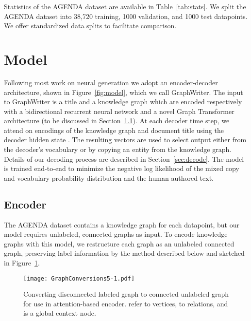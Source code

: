 \documentclass[11pt,a4paper]{article}
\begin{document}
Statistics of the AGENDA dataset are available in Table~\ref{tab:stats}.
We split the AGENDA dataset into 38,720 training, 1000 validation, and 1000 test datapoints.
We offer standardized data splits to facilitate comparison. 



\section{Model}

Following most work on neural generation we adopt an encoder-decoder architecture, shown in Figure~\ref{fig:model}, which we call GraphWriter.
The input to GraphWriter is a title and a knowledge graph which are encoded respectively with a bidirectional recurrent neural network and a novel Graph Transformer architecture (to be discussed in
  Section~\ref{sec:encoder}). 
At each decoder time step, we attend on encodings of the knowledge graph and document title using the decoder hidden state .
The resulting vectors are used to select output  either from the decoder's vocabulary or by copying an entity from the knowledge graph. 
Details of our decoding process are described in Section~\ref{sec:decode}.
The model is trained end-to-end to minimize the negative log likelihood of the mixed copy and vocabulary probability distribution and the human authored text. 


\subsection{Encoder}\label{sec:encoder}

The AGENDA dataset contains a knowledge graph for each datapoint, but our model requires unlabeled, connected graphs as input. 
To encode knowledge graphs with this model, we restructure each graph as an unlabeled connected graph, preserving label information by the method described below and sketched in Figure~\ref{fig:graph}. 

\begin{figure}[t]
    \centering
    \texttt{[image: GraphConversions5-1.pdf]}
    \caption{Converting disconnected labeled graph to connected unlabeled graph for use in attention-based encoder.  refer to vertices,  to relations, and  is a global context node.}
    \label{fig:graph}
\end{figure}
\end{document}

